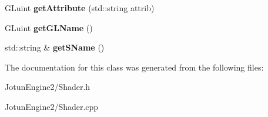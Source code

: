 \begin{DoxyCompactItemize}
\item 
\hypertarget{class_shader_a7dd239254890247f4fea33562321d5a4}{G\-Luint {\bfseries get\-Attribute} (std\-::string attrib)}\label{class_shader_a7dd239254890247f4fea33562321d5a4}

\item 
\hypertarget{class_shader_a4f02454610c65e719f06c3c62e2dafd6}{G\-Luint {\bfseries get\-G\-L\-Name} ()}\label{class_shader_a4f02454610c65e719f06c3c62e2dafd6}

\item 
\hypertarget{class_shader_a216d3749ecd7783aff7052c8c50eb65f}{std\-::string \& {\bfseries get\-S\-Name} ()}\label{class_shader_a216d3749ecd7783aff7052c8c50eb65f}

\end{DoxyCompactItemize}


The documentation for this class was generated from the following files\-:\begin{DoxyCompactItemize}
\item 
Jotun\-Engine2/Shader.\-h\item 
Jotun\-Engine2/Shader.\-cpp\end{DoxyCompactItemize}

